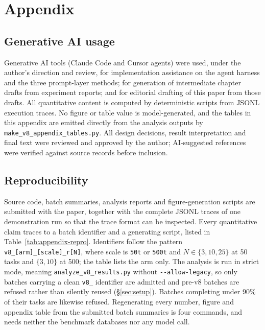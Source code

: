\documentclass[conference]{IEEEtran}
\begin{document}
\section*{Appendix}

\subsection*{Generative AI usage}

\scriptsize
Generative AI tools (Claude Code and Cursor agents) were used, under the
author's direction and review, for implementation assistance on the agent
harness and the three prompt-layer methods; for generation of intermediate
chapter drafts from experiment reports; and for editorial drafting of this paper
from those drafts. All quantitative content is computed by deterministic scripts
from JSONL execution traces. No figure or table value is model-generated, and
the tables in this appendix are emitted directly from the analysis outputs by
\texttt{make\_v8\_appendix\_tables.py}. All design decisions, result
interpretation and final text were reviewed and approved by the author;
AI-suggested references were verified against source records before inclusion.
\normalsize

\subsection*{Reproducibility}

\scriptsize
Source code, batch summaries, analysis reports and figure-generation scripts are
submitted with the paper, together with the complete JSONL traces of one
demonstration run so that the trace format can be inspected. Every quantitative
claim traces to a batch identifier
and a generating script, listed in Table~\ref{tab:appendix-repro}. Identifiers
follow the pattern \texttt{v8\_[arm]\_[scale]\_r[N]}, where scale is
\texttt{50t} or \texttt{500t} and $N \in \{3,10,25\}$ at 50 tasks and
$\{3,10\}$ at 500; the table lists the arm only. The analysis
is run in strict mode, meaning \texttt{analyze\_v8\_results.py} without
\texttt{-{}-allow-legacy}, so only batches carrying a clean \texttt{v8\_}
identifier are admitted and pre-v8 batches are refused rather than silently
reused (§\ref{sec:setup}). Batches completing under 90\% of their tasks are
likewise refused. Regenerating every number, figure and appendix table from the
submitted batch summaries is four commands, and needs neither the benchmark
databases nor any model call.
\normalsize
\end{document}
